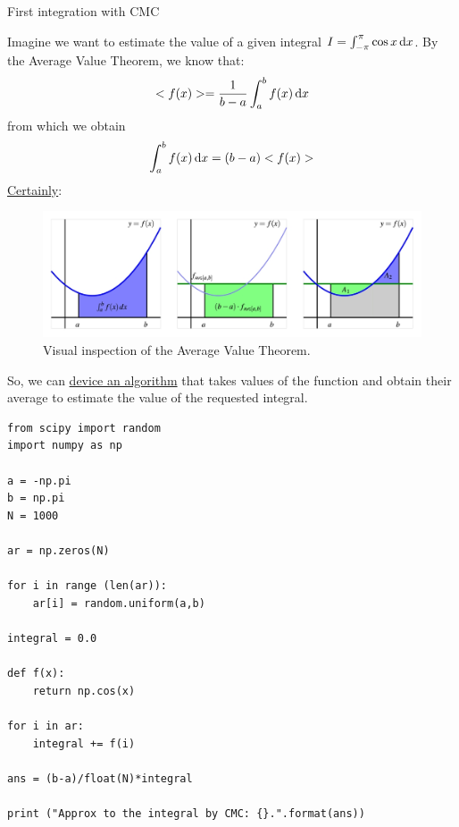 \documentclass{beamer}
\begin{document}
\begin{frame}{First integration with CMC}

    Imagine we want to estimate the value of a given integral $I=\int_{-\pi}^{\pi} \cos x \mathop{}\!\mathrm{d} x$.
    By the Average Value Theorem, we know that:
    \[
        <f(x)>=\frac{1}{b-a}\int_a^b f(x) \mathop{}\!\mathrm{d} x\]
    from which we obtain
    \[\int_a^b f(x) \mathop{}\!\mathrm{d} x = (b-a)<f(x)>
        \]
    \href{https://www.utrgv.edu/cstem/utrgv-calculus/integration/average-value/index.htm}{Certainly}:
    \begin{figure}
        \includegraphics[width=0.7\linewidth]{average-value}
        \caption{Visual inspection of the Average Value Theorem.}
        \label{fig:AVT}
    \end{figure}
    
    So, we can \href{https://www.geeksforgeeks.org/monte-carlo-integration-in-python/}{device an algorithm} that takes values of the function and obtain their average to estimate the value of the requested integral. 

\begin{lstlisting}
from scipy import random 
import numpy as np 
        
a = -np.pi
b = np.pi 
N = 1000
        
ar = np.zeros(N) 
        
for i in range (len(ar)): 
    ar[i] = random.uniform(a,b) 
        
integral = 0.0
        
def f(x): 
    return np.cos(x) 
        
for i in ar: 
    integral += f(i) 
        
ans = (b-a)/float(N)*integral 
        
print ("Approx to the integral by CMC: {}.".format(ans)) 
\end{lstlisting}

\end{frame}
\end{document}
